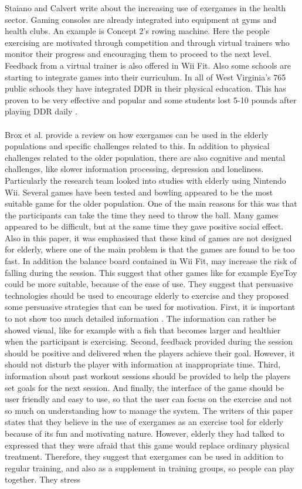 Staiano and Calvert \cite{staiano2011exergames} write about the increasing use of exergames in the health sector. Gaming consoles are already integrated into equipment at gyms and health clubs. An example is Concept 2’s rowing machine. Here the people exercising are motivated through competition and through virtual trainers who monitor their progress and encouraging them to proceed to the next level. Feedback from a virtual trainer is also offered in Wii Fit. Also some schools are starting to integrate games into their curriculum. In all of West Virginia’s 765 public schools they have integrated DDR in their physical education. This has proven to be very effective and popular and some students lost 5-10 pounds after playing DDR daily \cite{staiano2011exergames}. \\ \\
Brox et al. \cite{exergamesforelderly} provide a review on how exergames can be used in the elderly populations and specific challenges related to this. In addition to physical challenges related to the older population, there are also cognitive and  mental challenges, like slower information processing, depression and loneliness. Particularly the research team  looked into studies with elderly using Nintendo Wii. Several games have been tested and bowling appeared to be the most suitable game for the older population. One of the main reasons for this was that the participants can take the time they need to throw the ball. Many games appeared to be difficult, but at the same time they gave positive social effect. Also in this paper, it was emphasised that these kind of games are not designed for elderly, where one of the main problem is that the games are found to be too fast. In addition the balance board contained in Wii Fit, may increase the risk of falling during the session. This suggest that other games like  for example EyeToy could be more suitable, because of the ease of use. They suggest that persuasive technologies should be used to encourage elderly to exercise and they proposed some persuasive strategies that can be used for motivation. First, it is important to not show too much  detailed information . The information can rather be showed visual, like for example with a fish that becomes larger and healthier when the participant is exercising. Second, feedback provided during the session should be positive and delivered when the players achieve their goal. However, it should not disturb the player with information at inappropriate time. Third, information about past workout sessions should be  provided to help the players set goals for the next session. And finally, the interface of the game should be user friendly and easy to use, so that the user can focus on the exercise and not so much on understanding how to manage the system.  The writers of this paper states that they believe in the use of exergames as an exercise tool for elderly because of its fun and motivating nature. However, elderly they had talked to expressed that they were afraid that this game would replace ordinary physical treatment. Therefore, they suggest that exergames can be used in addition to regular training, and also as a supplement in training groups, so people can play together. They stress 
